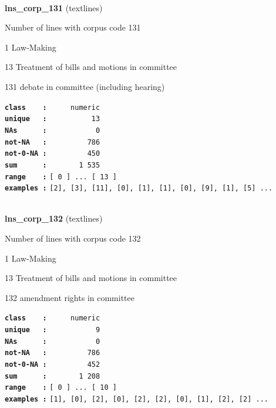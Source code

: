 \documentclass[]{article}
\begin{document}
~

\textbf{lns\_corp\_131} (textlines)

Number of lines with corpus code 131

1 Law-Making

13 Treatment of bills and motions in committee

131 debate in committee (including hearing)

\textbf{\texttt{class\ \ \ \ :}} \texttt{~~~~~numeric}\\
\textbf{\texttt{unique\ \ \ :}} \texttt{~~~~~~~~~~13}\\
\textbf{\texttt{NAs\ \ \ \ \ \ :}} \texttt{~~~~~~~~~~~0}\\
\textbf{\texttt{not-NA\ \ \ :}} \texttt{~~~~~~~~~786}\\
\textbf{\texttt{not-0-NA\ :}} \texttt{~~~~~~~~~450}\\
\textbf{\texttt{sum\ \ \ \ \ \ :}} \texttt{~~~~~~~1~535}\\
\textbf{\texttt{range\ \ \ \ :}}
\texttt{{[}\ 0\ {]}\ ...\ {[}\ 13\ {]}}\\
\textbf{\texttt{examples\ :}}
\texttt{{[}2{]},\ {[}3{]},\ {[}11{]},\ {[}0{]},\ {[}1{]},\ {[}1{]},\ {[}0{]},\ {[}9{]},\ {[}1{]},\ {[}5{]}\ ...}\\

~

\textbf{lns\_corp\_132} (textlines)

Number of lines with corpus code 132

1 Law-Making

13 Treatment of bills and motions in committee

132 amendment rights in committee

\textbf{\texttt{class\ \ \ \ :}} \texttt{~~~~~numeric}\\
\textbf{\texttt{unique\ \ \ :}} \texttt{~~~~~~~~~~~9}\\
\textbf{\texttt{NAs\ \ \ \ \ \ :}} \texttt{~~~~~~~~~~~0}\\
\textbf{\texttt{not-NA\ \ \ :}} \texttt{~~~~~~~~~786}\\
\textbf{\texttt{not-0-NA\ :}} \texttt{~~~~~~~~~452}\\
\textbf{\texttt{sum\ \ \ \ \ \ :}} \texttt{~~~~~~~1~208}\\
\textbf{\texttt{range\ \ \ \ :}}
\texttt{{[}\ 0\ {]}\ ...\ {[}\ 10\ {]}}\\
\textbf{\texttt{examples\ :}}
\texttt{{[}1{]},\ {[}0{]},\ {[}2{]},\ {[}0{]},\ {[}2{]},\ {[}2{]},\ {[}0{]},\ {[}1{]},\ {[}2{]},\ {[}2{]}\ ...}\\
\end{document}
